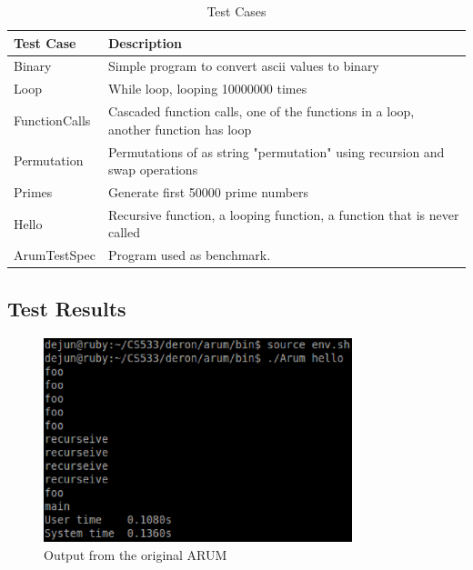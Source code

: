 \documentclass[11pt,letterpaper,oneside]{article}
\begin{document}
\begin{table}[th]
\caption{Test Cases}
\centering
\begin{tabular}{ll}
\hline
Test Case & Description \\
\hline
Binary & Simple program to convert ascii values to binary \\
Loop & While loop, looping 10000000 times \\
FunctionCalls & Cascaded function calls, one of the functions in a loop, another function has loop \\
Permutation & Permutations of as string "permutation" using recursion and swap operations \\
Primes & Generate first 50000 prime numbers \\
Hello & Recursive function, a looping function, a function that is never called \\
ArumTestSpec & Program used as benchmark.
\end{tabular}
\label{tb:TestCases}
\end{table}

\subsection{Test Results}


\begin{figure}
\begin{center}
\includegraphics[width=0.8\textwidth]{orig.eps}
\caption{Output from the original ARUM}
\label{fig:orig}
\end{center}
\end{figure}
\end{document}

